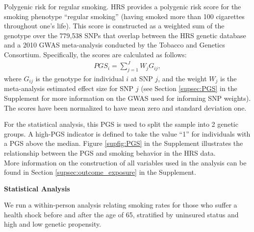\documentclass[12pt]{article}
\begin{document}
\noindent \textsf{Polygenic risk for regular smoking.} HRS provides a polygenic risk score for the smoking phenotype ``regular smoking'' (having smoked more than 100 cigarettes throughout one's life). This score is constructed as a weighted sum of the genotype over the 779,538 SNPs that overlap between the HRS genetic database and a 2010 GWAS meta-analysis conducted by the Tobacco and Genetics Consortium.\cite{TAG2010} Specifically, the scores are calculated as follows:
\begin{align}
PGS_i = \sum_{j=1}^{J} W_j G_{ij},
\end{align}
\normalsize where $G_{ij}$ is the genotype for individual $i$ at SNP $j$, and the weight $W_j$ is the meta-analysis estimated effect size for SNP $j$ (see Section \ref*{supsec:PGS} in the Supplement for more information on the GWAS used for informing SNP weights). The scores have been normalized to have mean zero and standard deviation one.\cite{HRSPGenscore2017}

For the statistical analysis, this PGS is used to split the sample into 2 genetic groups. A high-PGS indicator is defined to take the value ``1'' for individuals with a PGS above the median. Figure \ref*{supfig:PGS} in the Supplement illustrates the relationship between the PGS and smoking behavior in the HRS data. \\

\noindent More information on the construction of all variables used in the analysis can be found in Section \ref*{supsec:outcome_exposure} in the Supplement.


\vspace{5mm}
\noindent \textbf{\textsf{\textcolor{NavyBlue}{Statistical Analysis}}}

\noindent
We run a within-person analysis relating smoking rates for those who suffer a health shock before and after the age of 65, stratified by uninsured status and high and low genetic propensity.
\end{document}
